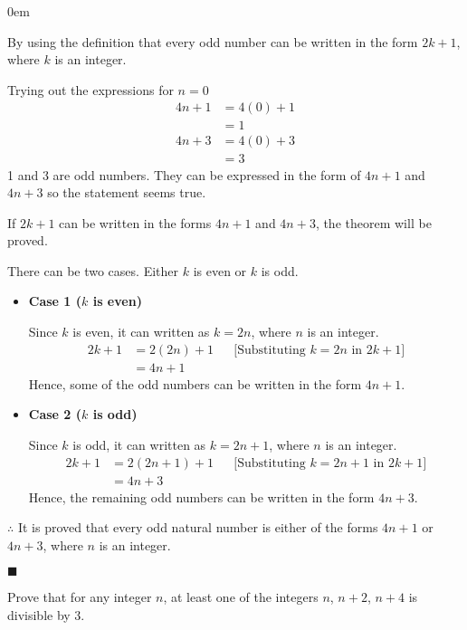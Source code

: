 \documentclass[12pt]{article}
\renewcommand{\qed}{\hfill$\blacksquare$}
\renewenvironment{proof}{\begin{addmargin}[1em]{0em}\begin{newproof}}{\end{newproof}\end{addmargin}\qed}
\newenvironment{problem}[2][Problem]{\begin{trivlist}
\item[\hskip \labelsep {\bfseries #1}\hskip \labelsep {\bfseries #2.}]}{\end{trivlist}}
\begin{document}
\begin{proof}
By using the definition that every odd number can be written in the form $2k+1$, where $k$ is an integer.

Trying out the expressions for $n=0$
\begin{align*}
    4n+1 &= 4(0)+1 \\
         &= 1 \\
    4n+3 &= 4(0)+3 \\
         &= 3
\end{align*}
1 and 3 are odd numbers. They can be expressed in the form of $4n + 1$ and $4n + 3$ so the statement seems true.

\hfill \break
If $2k+1$ can be written in the forms $4n+1$ and $4n+3$, the theorem will be proved.

\hfill \break
There can be two cases. Either $k$ is even or $k$ is odd.
\begin{itemize}
    \item \textbf{Case 1 ($k$ is even)}
    
    Since $k$ is even, it can written as $k=2n$, where $n$ is an integer.
    \begin{align*}
        2k+1 &= 2(2n)+1 &&\text{[Substituting $k=2n$ in $2k+1$]} \\
             &= 4n + 1
    \end{align*}
    Hence, some of the odd numbers can be written in the form $4n+1$.
    
    \item \textbf{Case 2 ($k$ is odd)}

    Since $k$ is odd, it can written as $k=2n+1$, where $n$ is an integer.
    \begin{align*}
        2k+1 &= 2(2n+1)+1 &&\text{[Substituting $k=2n+1$ in $2k+1$]} \\
             &= 4n + 3
    \end{align*}
    Hence, the remaining odd numbers can be written in the form $4n+3$.
\end{itemize}

\hfill \break
$\therefore$ It is proved that every odd natural number is either of the forms $4n + 1$ or $4n + 3$, where $n$ is an integer.
\end{proof}

\pagebreak


\begin{problem}{5}
Prove that for any integer $n$, at least one of the integers $n$, $n + 2$, $n + 4$ is divisible by 3.
\end{problem}
\end{document}
